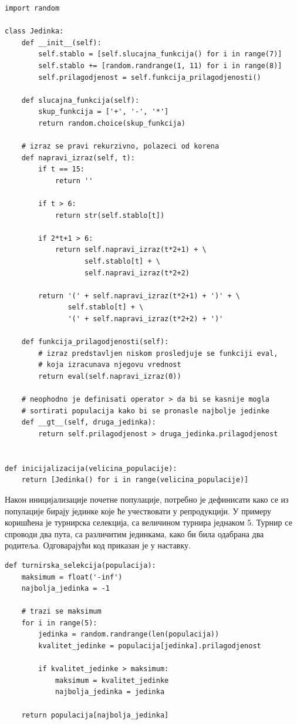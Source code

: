 \documentclass[a4paper]{article}
\begin{document}
\smallskip
\begin{lstlisting}[frame=single, label=simple]
import random

class Jedinka:
    def __init__(self):
        self.stablo = [self.slucajna_funkcija() for i in range(7)]
        self.stablo += [random.randrange(1, 11) for i in range(8)]
        self.prilagodjenost = self.funkcija_prilagodjenosti()

    def slucajna_funkcija(self):
        skup_funkcija = ['+', '-', '*']
        return random.choice(skup_funkcija)

    # izraz se pravi rekurzivno, polazeci od korena
    def napravi_izraz(self, t):
        if t == 15:
            return ''

        if t > 6:
            return str(self.stablo[t])

        if 2*t+1 > 6:
            return self.napravi_izraz(t*2+1) + \
                   self.stablo[t] + \
                   self.napravi_izraz(t*2+2)

        return '(' + self.napravi_izraz(t*2+1) + ')' + \
               self.stablo[t] + \
               '(' + self.napravi_izraz(t*2+2) + ')'

    def funkcija_prilagodjenosti(self):
        # izraz predstavljen niskom prosledjuje se funkciji eval,
        # koja izracunava njegovu vrednost
        return eval(self.napravi_izraz(0))

    # neophodno je definisati operator > da bi se kasnije mogla
    # sortirati populacija kako bi se pronasle najbolje jedinke
    def __gt__(self, druga_jedinka):
        return self.prilagodjenost > druga_jedinka.prilagodjenost
        
    
def inicijalizacija(velicina_populacije):
    return [Jedinka() for i in range(velicina_populacije)]
\end{lstlisting}

Након иницијализације почетне популације, потребно је дефинисати како се из популације бирају јединке које ће учествовати у репродукцији. У примеру коришћена је турнирска селекција, са величином турнира једнаком 5. Турнир се спроводи два пута, са различитим јединкама, како би била одабрана два родитеља. Одговарајући код приказан је у наставку.

\bigskip
\begin{lstlisting}[frame=single]
def turnirska_selekcija(populacija):
    maksimum = float('-inf')
    najbolja_jedinka = -1

    # trazi se maksimum
    for i in range(5):
        jedinka = random.randrange(len(populacija))
        kvalitet_jedinke = populacija[jedinka].prilagodjenost

        if kvalitet_jedinke > maksimum:
            maksimum = kvalitet_jedinke
            najbolja_jedinka = jedinka

    return populacija[najbolja_jedinka]
\end{lstlisting}
\end{document}

